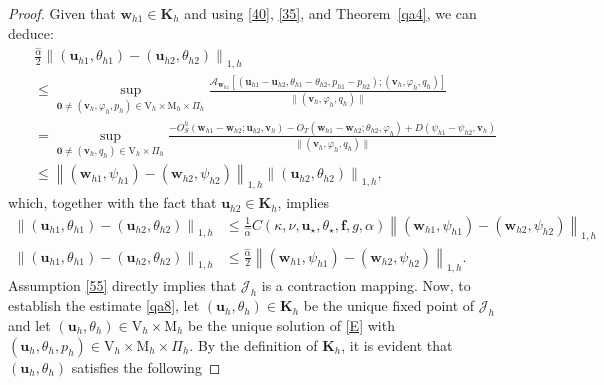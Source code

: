 \documentclass[10pt,a4paper]{article}
\begin{document}
\begin{proof}
            Given that $\boldsymbol{w}_{h1} \in \boldsymbol{K}_h$ and using \eqref{40}, \eqref{35}, and Theorem~\ref{qa4}, we can deduce:
  			$$
  			\begin{aligned}
  			& \frac{\hat{\alpha}}{2}\left\|(\boldsymbol{u}_{h1}, \theta_{h1})-(\boldsymbol{u}_{h2}, \theta_{h2})\right\|_{1,h} \\ 
            & \leq \sup _{\boldsymbol{0} \neq(\boldsymbol{v}_h,\varphi_h,p_h) \in \mathrm{V}_h \times \mathrm{M}_h \times  \Pi_h} \frac{\mathcal{A}_{\boldsymbol{w}_{h1}}\left[\left( \boldsymbol{u}_{h1}-\boldsymbol{u}_{h2}, \theta_{h1}-\theta_{h2}, p_{h1}-p_{h2}\right);( \boldsymbol{v}_h, \varphi_h,q_h)\right]}{\|( \boldsymbol{v}_h,\varphi_h,q_h)\|} \\
  			& =\sup _{\boldsymbol{0} \neq( \boldsymbol{v}_h,q_h) \in \mathrm{V}_h \times \Pi_h} \frac{-O_S^h\left(\boldsymbol{w}_{h1}-\boldsymbol{w}_{h2} ;  \boldsymbol{u}_{h2}, \boldsymbol{v}_h \right) -O_T\left(\boldsymbol{w}_{h1}-\boldsymbol{w}_{h2} ;  \theta_{h2}, \varphi_h \right) + D(\psi_{h1} -\psi_{h2},\boldsymbol{v}_h)}{\|(\boldsymbol{v}_h,\varphi_h,q_h)\|} \\
  			& \leq \left\|(\boldsymbol{w}_{h1},\psi_{h1})-(\boldsymbol{w}_{h2},\psi_{h2})\right\|_{1,h}\left\|(\boldsymbol{u}_{h2}, \theta_{h2})\right\|_{1,h},
  			\end{aligned}
  			$$
  			which, together with the fact that $\boldsymbol{u}_{h2} \in \boldsymbol{K}_h$, implies
            \begin{align*}
                \left\|(\boldsymbol{u}_{h1}, \theta_{h1})-(\boldsymbol{u}_{h2}, \theta_{h2})\right\|_{1,h} & \leq \frac{1}{\hat{\alpha}}C(\kappa, \nu, \boldsymbol{u}_{\star}, \theta_{\star}, \boldsymbol{f}, g, \alpha)\left\|(\boldsymbol{w}_{h1},\psi_{h1})-(\boldsymbol{w}_{h2},\psi_{h2})\right\|_{1,h} \\
               \left\|(\boldsymbol{u}_{h1}, \theta_{h1})-(\boldsymbol{u}_{h2}, \theta_{h2})\right\|_{1,h} & \leq \frac{\hat{\alpha}}{2}  \left\|(\boldsymbol{w}_{h1},\psi_{h1})-(\boldsymbol{w}_{h2},\psi_{h2})\right\|_{1,h}.
            \end{align*}
  			Assumption \eqref{55} directly implies that $\mathcal{J}_h$ is a contraction mapping.
  			Now, to establish the estimate \eqref{qa8}, let $(\boldsymbol{u}_h, \theta_h) \in \boldsymbol{K}_h$ be the unique fixed point of $\mathcal{J}_h$ and let $(\boldsymbol{u}_h, \theta_h) \in \mathrm{V}_h \times \mathrm{M}_h $ be the unique solution of \eqref{E} with $( \boldsymbol{u}_h,\theta_h,p_h) \in \mathrm{V}_h \times \mathrm{M}_h \times \Pi_h $. By the definition of $\boldsymbol{K}_h$, it is evident that $(\boldsymbol{u}_h, \theta_h)$ satisfies the following

\end{proof}
\end{document}
